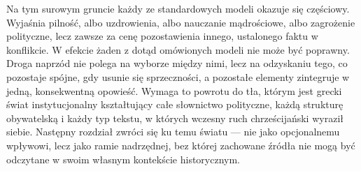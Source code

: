 Na tym surowym gruncie każdy ze standardowych modeli okazuje się częściowy.
Wyjaśnia pilność, albo uzdrowienia, albo nauczanie mądrościowe, albo zagrożenie polityczne, lecz zawsze za cenę pozostawienia innego, ustalonego faktu w konflikcie.
W efekcie żaden z dotąd omówionych modeli nie może być poprawny.
Droga naprzód nie polega na wyborze między nimi, lecz na odzyskaniu tego, co pozostaje spójne, gdy usunie się sprzeczności, a pozostałe elementy zintegruje w jedną, konsekwentną opowieść.
Wymaga to powrotu do tła, którym jest grecki świat instytucjonalny kształtujący całe słownictwo polityczne, każdą strukturę obywatelską i każdy typ tekstu, w których wczesny ruch chrześcijański wyraził siebie.
Następny rozdział zwróci się ku temu światu — nie jako opcjonalnemu wpływowi, lecz jako ramie nadrzędnej, bez której zachowane źródła nie mogą być odczytane w swoim własnym kontekście historycznym.